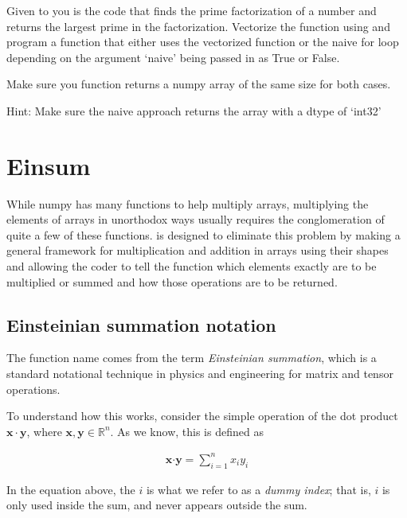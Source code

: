 \begin{problem}

Given to you is the code that finds the prime factorization of a number and returns the largest prime in the factorization. 
Vectorize the function using  and program a function that either uses the vectorized function or the naive for loop depending on the argument `naive' being passed in as True or False. 

Make sure you function returns a numpy array of the same size for both cases.

\noindent Hint: Make sure the naive approach returns the array with a dtype of `int32'

\end{problem}

\section*{Einsum}

While numpy has many functions to help multiply arrays, multiplying the elements of arrays in unorthodox ways usually requires the conglomeration of quite a few of these functions. 
 is designed to eliminate this problem by making a general framework for multiplication and addition in arrays using their shapes and allowing the coder to tell the function which elements exactly are to be multiplied or summed and how those operations are to be returned.

\subsection*{Einsteinian summation notation}
The function name  comes from the term \emph{Einsteinian summation}, which is a standard notational technique in physics and engineering for matrix and tensor operations.

To understand how this works, consider the simple operation of the dot product $\mathbf{x} \cdot \mathbf{y}$, where $\mathbf{x}, \mathbf{y} \in \mathbb{R}^n$.
As we know, this is defined as 

\begin{align*}
\mathbf{x} \boldsymbol{\cdot} \mathbf{y} = \sum_{i=1}^{n} x_i y_i
\end{align*}

In the equation above, the $i$ is what we refer to as a \emph{dummy index}; that is, $i$ is only used inside the sum, and never appears outside the sum. 

